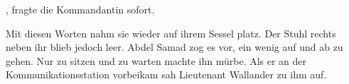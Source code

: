 \par

, fragte die Kommandantin sofort.

\par


\par

Mit diesen Worten nahm sie wieder auf ihrem Sessel platz.
Der Stuhl rechts neben ihr blieb jedoch leer.
Abdel Samad zog es vor, ein wenig auf und ab zu gehen.
Nur zu sitzen und zu warten machte ihn mürbe.
Als er an der Kommunikationsstation vorbeikam sah Lieutenant Wallander zu ihm auf.

\par

